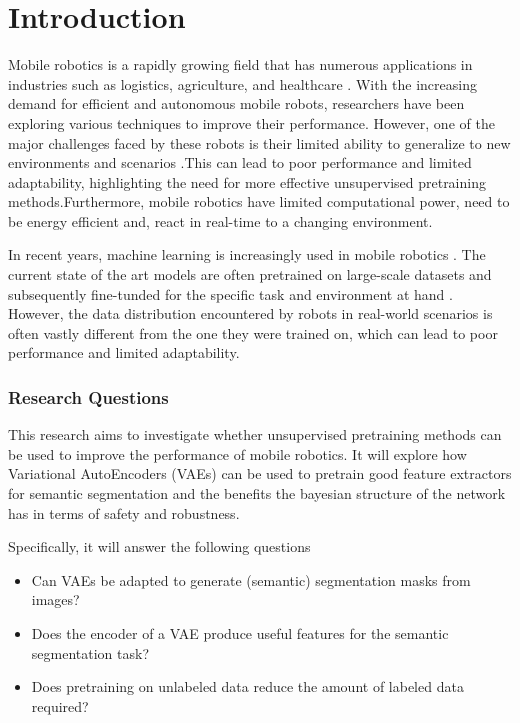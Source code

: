 \chapter{Introduction}\label{chapter:introduction}

Mobile robotics is a rapidly growing field that has numerous applications in industries such as logistics, agriculture, and healthcare \cite{cognominal2021evolving,kebede2024review,clark2023amazon}. With the increasing demand for efficient and autonomous mobile robots, researchers have been exploring various techniques to improve their performance\cite{yu2018ds,taketomi2017visual}. However, one of the major challenges faced by these robots is their limited ability to generalize to new environments and scenarios \cite{alatise2020review}.This can lead to poor performance and limited adaptability, highlighting the need for more effective unsupervised pretraining methods.Furthermore, mobile robotics have limited computational power, need to be energy efficient and, react in real-time to a changing environment. 

In recent years, machine learning is increasingly used in mobile robotics \cite{almeida2018localization,yu2018ds}. The current state of the art models are often pretrained on large-scale datasets and subsequently fine-tunded for the specific task and environment at hand \cite{Goodfellow-et-al-2016}. However, the data distribution encountered by robots in real-world scenarios is often vastly different from the one they were trained on, which can lead to poor performance and limited adaptability.

\subsection*{Research Questions}
This research aims to investigate whether unsupervised pretraining methods can be used to improve the performance of mobile robotics. It will explore how Variational AutoEncoders (VAEs) \cite{kingma2014autoencodingvariationalbayes} can be used to pretrain good feature extractors for semantic segmentation and the benefits the bayesian structure of the network has in terms of safety and robustness.

Specifically, it will answer the following questions
\begin{itemize}
    \item Can VAEs be adapted to generate (semantic) segmentation masks from images?
    \item Does the encoder of a VAE produce useful features for the semantic segmentation task?
    \item Does pretraining on unlabeled data reduce the amount of labeled data required?
\end{itemize}


